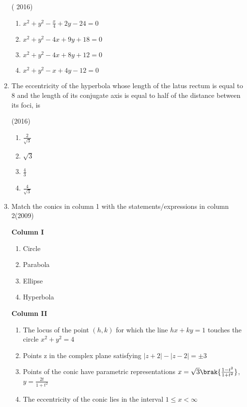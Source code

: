 \begin{enumerate}
\hfill( 2016)
					\begin{multicols}{2}
\begin{enumerate}
    \item $x^2+y^2-\frac{x}{4}+2y-24=0$ 
    \item $x^2+y^2-4x+9y+18=0$ 
    \item $x^2+y^2-4x+8y+12=0$
    \item $x^2+y^2-x+4y-12=0$
\end{enumerate}\end{multicols}
\item The eccentricity of the hyperbola whose length of the latus rectum is equal to $8$ and the length of its conjugate axis is equal to half of the distance between its foci, is 

\hfill(2016)
						\begin{multicols}{2}
\begin{enumerate}
    \item $\frac{2}{\sqrt{3}}$
    \item $\sqrt{3}$
    \item $\frac{4}{3}$
    \item $\frac{4}{\sqrt{3}}$
\end{enumerate}\end{multicols}

\item Match the conics in column 1 with the statements/expressions in column 2\hfill{(2009)}

\begin{multicols}{2}
\textbf{Column I}
\begin{enumerate}
    \item  Circle
    \item  Parabola
    \item  Ellipse 
    \item  Hyperbola  
\end{enumerate} 
\columnbreak
\textbf{Column II}
\begin{enumerate}
	\item The locus of the point ${(h,k)}$ for which the line $hx + ky =1$ touches the circle $x^2 + y^2 = 4$
    \item Points z in the complex plane satisfying $|z + 2|- |z - 2|= \pm 3$
    \item Points of the conic have parametric representations $x=\sqrt{3}
	    \brak{\frac{1 - t^2}{1 + t^2}}$, $ y = \frac{2t}{1 + t^2}$

    \item The eccentricity of the conic lies in the interval $1 \leq x < \infty$


\end{enumerate}
\end{multicols}
\end{enumerate}
